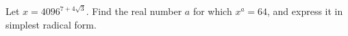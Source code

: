Let $x=4096^{7+4\sqrt3}$. Find the real number $a$ for which $x^a=64$, and express it in simplest radical form.
